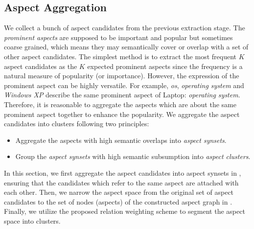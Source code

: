 \subsection{Aspect Aggregation}
We collect a bunch of aspect candidates from the previous extraction stage. 
The \textit{prominent aspects} are supposed
to be important and popular but sometimes coarse grained, which 
means they may semantically cover or overlap with a set of other aspect 
candidates.
The simplest method is to extract the most frequent $K$ aspect candidates as the $K$ expected prominent aspects
since the frequency is a natural measure of popularity (or importance).
However, the expression of the prominent aspect 
can be highly versatile. 
For example, \textit{os}, 
\textit{operating system}
and \textit{Windows XP}
describe the same prominent aspect of Laptop: 
\textit{operating system}.
Therefore, it is reasonable
to aggregate the aspects which are about the same 
prominent aspect together to enhance the popularity. 
We aggregate the aspect candidates 
into clusters following two principles:
\begin{itemize}
	\item  Aggregate the aspects with high semantic overlaps into \textit{aspect synsets}.
	\item Group the \textit{aspect synsets} 
	with high semantic subsumption into \textit{aspect clusters}.
\end{itemize}

In this section, we first aggregate the aspect candidates into aspect synsets in , 
ensuring that the candidates
which refer to the same aspect are attached with
each other.  
Then, we narrow the aspect space from the original set of  aspect candidates 
to the set of nodes (aspects) of the constructed aspect graph in
. 
Finally, we utilize the proposed relation weighting scheme 
to segment the aspect space into clusters.



